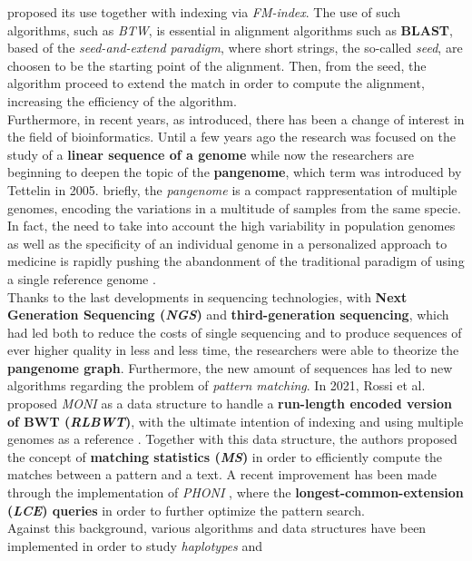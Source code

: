 \documentclass[a4paper,11pt, oneside]{article}
\begin{document}
proposed its use together with indexing via \textit{FM-index}. The use of such
algorithms, such as \textit{BTW}, is essential in alignment algorithms such as
\textbf{BLAST}, based of the \textit{seed-and-extend paradigm}, where short
strings, the so-called \textit{seed}, are choosen to be the starting point of
the alignment. Then, from the seed, the algorithm proceed to extend the match in
order to compute the alignment, increasing the efficiency of the algorithm.\\  
Furthermore, in recent years, as introduced, there has been a change of interest
in the field of bioinformatics. Until a few years ago the research was focused
on the study of a \textbf{linear sequence of a genome} while now the 
researchers are beginning to deepen the topic of the \textbf{pangenome}, which
term was 
introduced by Tettelin in 2005. briefly, the \textit{pangenome} is a compact
rappresentation of multiple genomes, encoding the variations in a multitude of
samples from the same specie. In fact, the need to take into 
account the high variability in population genomes as well as the specificity of
an individual genome in a personalized approach to medicine is rapidly pushing
the abandonment of the traditional paradigm of using a single reference genome
\cite{pangenome}. \\
Thanks to the last developments in sequencing technologies, with \textbf{Next
  Generation Sequencing (\textit{NGS})} and \textbf{third-generation
  sequencing}, which had led both 
to reduce the costs of single sequencing and to produce sequences of ever higher
quality in less and less time, the researchers were able to theorize the
\textbf{pangenome graph}. Furthermore, the new amount of sequences has led to
new algorithms regarding the problem of \textit{pattern matching}. In 2021,
Rossi et al. proposed \textit{MONI} as a data structure to handle a 
\textbf{run-length encoded version of BWT (\textit{RLBWT})}, with the ultimate
intention of indexing and using multiple genomes as a reference
\cite{moni}. Together with this data structure, the authors proposed the concept
of \textbf{matching statistics (\textit{MS})} in order to efficiently compute
the matches between a pattern and a text. A recent improvement has been made
through the implementation of \textit{PHONI} \cite{phoni}, where the
\textbf{longest-common-extension (\textit{LCE}) queries} in order to further
optimize the pattern search.\\ 
Against this background, various algorithms and data structures have
been implemented in order to study \textit{haplotypes} and
\end{document}
